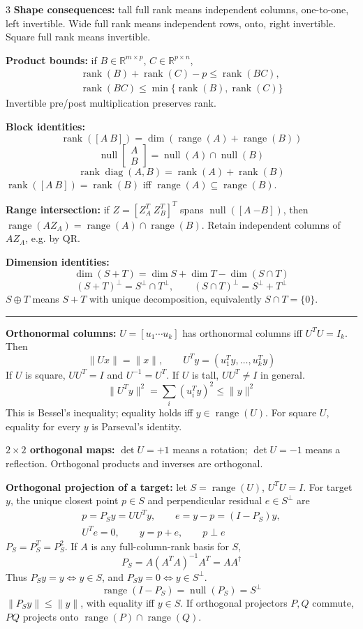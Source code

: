 \documentclass[10pt]{article}
\newcommand{\sect}[1]{\vspace{0.9pt}{\fontsize{7.2}{7.5}\selectfont\textbf{#1}}\vspace{0.25pt}\hrule\vspace{0.8pt}}
\newcommand{\sub}[1]{\textbf{#1}}
\newcommand{\R}{\mathbb{R}}
\newcommand{\rank}{\operatorname{rank}}
\newcommand{\range}{\operatorname{range}}
\newcommand{\nullsp}{\operatorname{null}}
\newcommand{\diag}{\operatorname{diag}}
\begin{document}
\begin{multicols*}{3}
\sub{Shape consequences:} tall full rank means independent columns,
one-to-one, left invertible. Wide full rank means independent rows, onto,
right invertible. Square full rank means invertible.

\sub{Product bounds:} if \(B\in\R^{m\times p}\),
\(C\in\R^{p\times n}\),
\[
\begin{gathered}
\rank(B)+\rank(C)-p\le\rank(BC),\\
\rank(BC)\le\min\{\rank(B),\rank(C)\}
\end{gathered}
\]
Invertible pre/post multiplication preserves rank.

\sub{Block identities:}
\[
\rank([A\ B])=\dim(\range(A)+\range(B))
\]
\[
\nullsp\!\begin{bmatrix}A\\B\end{bmatrix}
=\nullsp(A)\cap\nullsp(B)
\]
\[
\rank\diag(A,B)=\rank(A)+\rank(B)
\]
\(\rank([A\ B])=\rank(B)\) iff
\(\range(A)\subseteq\range(B)\).

\sub{Range intersection:} if
\(Z=[Z_A^T\ Z_B^T]^T\) spans \(\nullsp([A\ {-B}])\), then
\(\range(AZ_A)=\range(A)\cap\range(B)\). Retain independent columns of
\(AZ_A\), e.g. by QR.

\sub{Dimension identities:}
\[
\dim(S+T)=\dim S+\dim T-\dim(S\cap T)
\]
\[
(S+T)^\perp=S^\perp\cap T^\perp,\qquad
(S\cap T)^\perp=S^\perp+T^\perp
\]
\(S\oplus T\) means \(S+T\) with unique decomposition, equivalently
\(S\cap T=\{0\}\).

\sect{Orthogonality and QR (Lectures 8--9)}
\sub{Orthonormal columns:} \(U=[u_1\cdots u_k]\) has orthonormal columns
iff \(U^TU=I_k\). Then
\[
\|Ux\|=\|x\|,\qquad U^Ty=(u_1^Ty,\ldots,u_k^Ty)
\]
If \(U\) is square, \(UU^T=I\) and \(U^{-1}=U^T\). If \(U\) is tall,
\(UU^T\ne I\) in general.
\[
\|U^Ty\|^2=\sum_i(u_i^Ty)^2\le\|y\|^2
\]
This is Bessel's inequality; equality holds iff \(y\in\range(U)\).
For square \(U\), equality for every \(y\) is Parseval's identity.

\sub{\(2\times2\) orthogonal maps:} \(\det U=+1\) means a rotation;
\(\det U=-1\) means a reflection. Orthogonal products and inverses are
orthogonal.

\sub{Orthogonal projection of a target:} let
\(S=\range(U)\), \(U^TU=I\). For target \(y\), the unique closest
point \(p\in S\) and perpendicular residual \(e\in S^\perp\) are
\[
\begin{gathered}
p=P_Sy=UU^Ty,\qquad e=y-p=(I-P_S)y,\\
U^Te=0,\qquad y=p+e,\qquad p\perp e
\end{gathered}
\]
\(P_S=P_S^T=P_S^2\). If \(A\) is any full-column-rank basis for \(S\),
\[
P_S=A(A^TA)^{-1}A^T=AA^\dagger
\]
Thus \(P_Sy=y\iff y\in S\), and \(P_Sy=0\iff y\in S^\perp\).
\[
\range(I-P_S)=\nullsp(P_S)=S^\perp
\]
\(\|P_Sy\|\le\|y\|\), with equality iff \(y\in S\). If orthogonal
projectors \(P,Q\) commute, \(PQ\) projects onto
\(\range(P)\cap\range(Q)\).


\end{multicols*}
\end{document}
